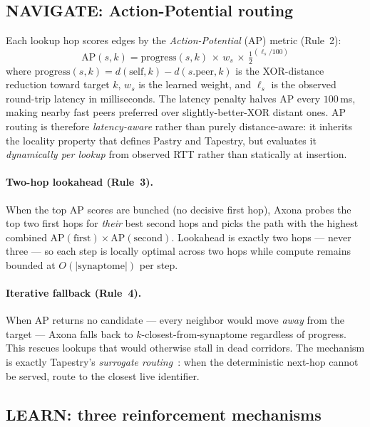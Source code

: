 \documentclass[conference]{IEEEtran}
\newcommand{\axona}{Axona\xspace}
\begin{document}
\subsection{NAVIGATE: Action-Potential routing}
\label{sec:axona-navigate}

Each lookup hop scores edges by the \emph{Action-Potential}
(AP) metric (Rule~2):
\begin{equation}
\mathrm{AP}(s, k) = \mathrm{progress}(s, k) \,\times\, w_s
\,\times\, \tfrac{1}{2}^{(\ell_s / 100)}
\label{eq:ap}
\end{equation}
where $\mathrm{progress}(s, k) = d(\mathrm{self}, k) -
d(s.\mathrm{peer}, k)$ is the XOR-distance reduction toward
target $k$, $w_s$ is the learned weight, and $\ell_s$ is the
observed round-trip latency in milliseconds.  The latency
penalty halves AP every $100$\,ms, making nearby fast peers
preferred over slightly-better-XOR distant ones.  AP routing
is therefore \emph{latency-aware} rather than purely
distance-aware: it inherits the locality property that defines
Pastry and Tapestry, but evaluates it \emph{dynamically per
lookup} from observed RTT rather than statically at insertion.

\paragraph{Two-hop lookahead (Rule~3).}
When the top AP scores are bunched (no decisive first hop),
\axona probes the top two first hops for \emph{their} best
second hops and picks the path with the highest combined
$\mathrm{AP}(\text{first}) \times \mathrm{AP}(\text{second})$.
Lookahead is exactly two hops --- never three --- so each step
is locally optimal across two hops while compute remains bounded
at $O(|\mathrm{synaptome}|)$ per step.

\paragraph{Iterative fallback (Rule~4).}
When AP returns no candidate --- every neighbor would move
\emph{away} from the target --- \axona falls back to
$k$-closest-from-synaptome regardless of progress.  This rescues
lookups that would otherwise stall in dead corridors.  The
mechanism is exactly Tapestry's \emph{surrogate
routing}~\cite{zhao2004tapestry}: when the deterministic
next-hop cannot be served, route to the closest live identifier.

\subsection{LEARN: three reinforcement mechanisms}
\label{sec:axona-learn}
\end{document}
